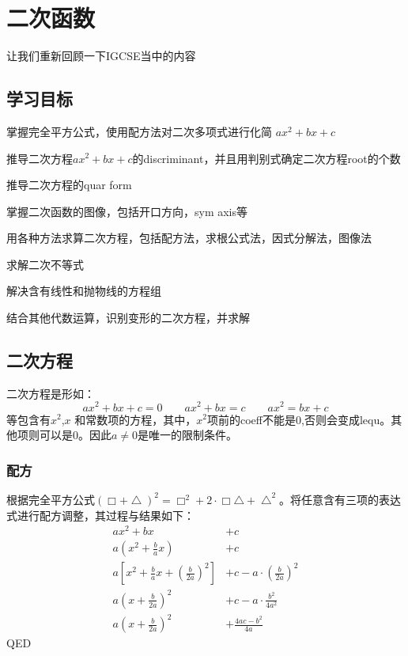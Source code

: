 \chapter{二次函数}
\label{ch: Quadratic Function}

让我们重新回顾一下IGCSE当中的内容

\section*{学习目标}
\begin{todolist}
	\item 掌握完全平方公式，使用配方法对二次多项式进行化简 $ax^2+bx+c$
	\item 推导二次方程$ax^2+bx+c$的\gls{discriminant}，并且用判别式确定二次方程\gls{root}的个数
	\item 推导二次方程的\gls{quar form}
	\item 掌握二次函数的图像，包括开口方向，\gls{sym axis}等
	\item 用各种方法求算二次方程，包括配方法，求根公式法，因式分解法，图像法
	\item 求解二次不等式
	\item 解决含有线性和抛物线的方程组
	\item 结合其他代数运算，识别变形的二次方程，并求解
\end{todolist}
\clearpage

\section{二次方程}
\label{sec:Quadratic Equation}
二次方程是形如：
\[
	ax^2+bx+c=0 \qquad ax^2+bx=c \qquad ax^2=bx+c
\]
等包含有$x^2$,$x$ 和常数项的方程，其中，$x^2$项前的\gls{coeff}不能是$0$,否则会变成\gls{lequ}。其他项则可以是$0$。因此$a\neq 0$是唯一的限制条件。

\subsection*{配方}
\label{subsec:Completing the Square}
根据完全平方公式$(\Box+\bigtriangleup )^2=\Box^2+2\cdot \Box \bigtriangleup +\bigtriangleup^2$。将任意含有三项的表达式进行配方调整，其过程与结果如下：
\begin{align*}
ax^2 +bx &+c\\
a\left( x^2+\frac{b}{a}x\right) &+c\\
a\left[ x^2+\frac{b}{a}x+\left(\frac{b}{2a}\right)^2\right]&+c -a\cdot\left(\frac{b}{2a}\right)^2 \\
a\left(x+\frac{b}{2a}\right)^2 &+c-a\cdot \frac{b^2}{4a^2}\\
a\left(x+\frac{b}{2a}\right)^2 &+\frac{4ac-b^2}{4a}
\end{align*}
QED\\

